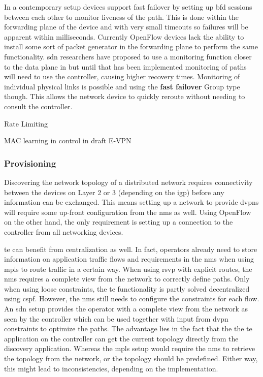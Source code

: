 In a contemporary setup devices support fast failover by setting up \ac{bfd} sessions between each other to monitor liveness of the path. This is done within the forwarding plane of the device and with very small timeouts so failures will be apparent within milliseconds. Currently OpenFlow devices lack the ability to install some sort of packet generator in the forwarding plane to perform the same functionality. \ac{sdn} researchers have proposed to use a monitoring function closer to the data plane in \cite{scalable-fault} but until that has been implemented monitoring of paths will need to use the controller, causing higher recovery times. Monitoring of individual physical links is possible and using the \textbf{fast failover} Group type though. This allows the network device to quickly reroute without needing to consult the controller.

Rate Limiting

MAC learning in control in draft E-VPN



\subsubsection{Provisioning} %
\label{ssub:provisioning}

Discovering the network topology of a distributed network requires connectivity between the devices on Layer 2 or 3 (depending on the \ac{igp}) before any information can be exchanged. This means setting up a network to provide \acp{dvpn} will require some up-front configuration from the \ac{nms} as well. Using OpenFlow on the other hand, the only requirement is setting up a connection to the controller from all networking devices. 

\acl{te} can benefit from centralization as well. In fact, operators already need to store information on application traffic flows and requirements in the \ac{nms} when using \ac{mpls} to route traffic in a certain way. When using \ac{rsvp} with explicit routes, the \ac{nms} requires a complete view from the network to correctly define paths. Only when using loose constraints, the \ac{te} functionality is partly solved decentralized using \ac{cspf}. However, the \ac{nms} still needs to configure the constraints for each flow. An \ac{sdn} setup provides the operator with a complete view from the network as seen by the controller which can be used together with input from \ac{dvpn} constraints to optimize the paths. The advantage lies in the fact that the the \ac{te} application on the controller can get the current topology directly from the discovery application. Whereas the \ac{mpls} setup would require the \ac{nms} to retrieve the topology from the network, or the topology should be predefined. Either way, this might lead to inconsistencies, depending on the implementation.


